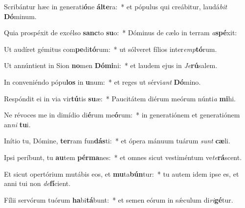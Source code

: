 \item Scribántur hæc in generati\textbf{ó}ne \textbf{ál}\textbf{te}ra:~* et pópulus qui creábitur, laudá\textit{bit} \textbf{Dó}minum.
\item Quia prospéxit de excélso \textbf{sanc}to \textbf{su}o:~* Dóminus de cælo in terram \textit{a}\textbf{spé}xit:
\item Ut audíret gémitus com\textbf{pe}di\textbf{tó}rum:~* ut sólveret fílios inter\textit{emp}\textbf{tó}rum.
\item Ut annúntient in Sion \textbf{no}men \textbf{Dó}\textbf{mi}ni:~* et laudem ejus in \textit{Je}\textbf{rú}salem.
\item In conveniéndo pópu\textbf{los} in \textbf{u}num:~* et reges ut sérvi\textit{ant} \textbf{Dó}mino.
\item Respóndit ei in via vir\textbf{tú}tis \textbf{su}æ:~* Paucitátem diérum meórum núnti\textit{a} \textbf{mi}hi.
\item Ne révoces me in dimídio di\textbf{é}rum me\textbf{ó}rum:~* in generatiónem et generatiónem an\textit{ni} \textbf{tu}i.
\item Inítio tu, Dómine, \textbf{ter}ram fun\textbf{dás}ti:~* et ópera mánuum tuárum \textit{sunt} \textbf{cæ}li.
\item Ipsi períbunt, tu \textbf{au}tem \textbf{pér}\textbf{ma}nes:~* et omnes sicut vestiméntum ve\textit{te}\textbf{rá}scent.
\item Et sicut opertórium mutábis eos, et \textbf{mu}ta\textbf{bún}tur:~* tu autem idem ipse es, et anni tui non \textit{de}\textbf{fí}cient.
\item Fílii servórum tuórum \textbf{ha}bi\textbf{tá}bunt:~* et semen eórum in sǽculum di\textit{ri}\textbf{gé}tur.
